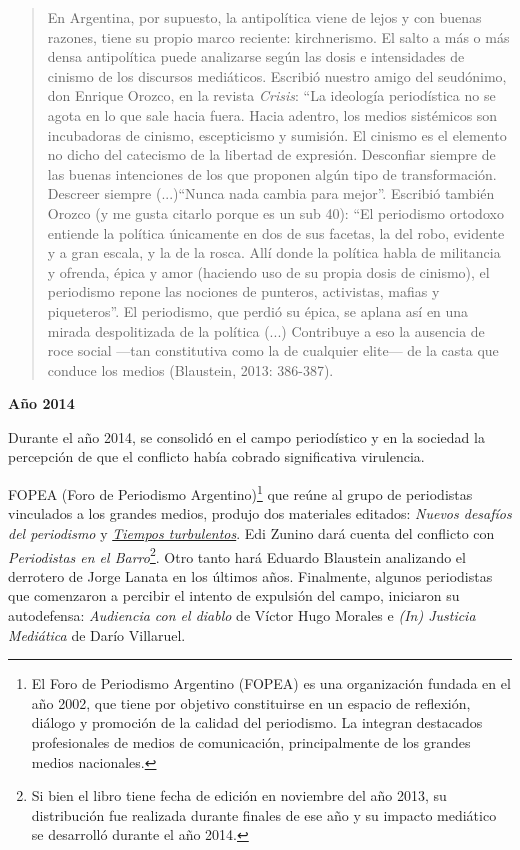 \begin{quote}
En Argentina, por supuesto, la antipolítica viene de lejos y con buenas razones, tiene su propio marco reciente: kirchnerismo. El salto a más o más densa antipolítica puede analizarse según las dosis e intensidades de cinismo de los discursos mediáticos. Escribió nuestro amigo del seudónimo, don Enrique Orozco, en la revista \emph{Crisis}: ``La ideología periodística no se agota en lo que sale hacia fuera. Hacia adentro, los medios sistémicos son incubadoras de cinismo, escepticismo y sumisión. El cinismo es el elemento no dicho del catecismo de la libertad de expresión. Desconfiar siempre de las buenas intenciones de los que proponen algún tipo de transformación. Descreer siempre (...)\enquote{Nunca nada cambia para mejor}. Escribió también Orozco (y me gusta citarlo porque es un sub 40): \enquote{El periodismo ortodoxo entiende la política únicamente en dos de sus facetas, la del robo, evidente y a gran escala, y la de la rosca. Allí donde la política habla de militancia y ofrenda, épica y amor (haciendo uso de su propia dosis de cinismo), el periodismo repone las nociones de punteros, activistas, mafias y piqueteros}. El periodismo, que perdió su épica, se aplana así en una mirada despolitizada de la política (...) Contribuye a eso la ausencia de roce social ---tan constitutiva como la de cualquier elite--- de la casta que conduce los medios (Blaustein, 2013: 386-387).
\end{quote}

\textbf{Año 2014}

Durante el año 2014, se consolidó en el campo periodístico y en la sociedad la percepción de que el conflicto había cobrado significativa virulencia.

FOPEA (Foro de Periodismo Argentino)\footnote{El Foro de Periodismo Argentino (FOPEA) es una organización fundada en el año 2002, que tiene por objetivo constituirse en un espacio de reflexión, diálogo y promoción de la calidad del periodismo. La integran destacados profesionales de medios de comunicación, principalmente de los grandes medios nacionales.} que reúne al grupo de periodistas vinculados a los grandes medios, produjo dos materiales editados: \emph{Nuevos desafíos del periodismo} y \href{http://www.cuspide.com/9789871496990/Tiempos+Turbulentos/}{\emph{Tiempos turbulentos}}. Edi Zunino dará cuenta del conflicto con \emph{Periodistas en el Barro}\footnote{Si bien el libro tiene fecha de edición en noviembre del año 2013, su distribución fue realizada durante finales de ese año y su impacto mediático se desarrolló durante el año 2014.}. Otro tanto hará Eduardo Blaustein analizando el derrotero de Jorge Lanata en los últimos años. Finalmente, algunos periodistas que comenzaron a percibir el intento de expulsión del campo, iniciaron su autodefensa: \emph{Audiencia con el diablo} de Víctor Hugo Morales e \emph{(In) Justicia Mediática} de Darío Villaruel.

